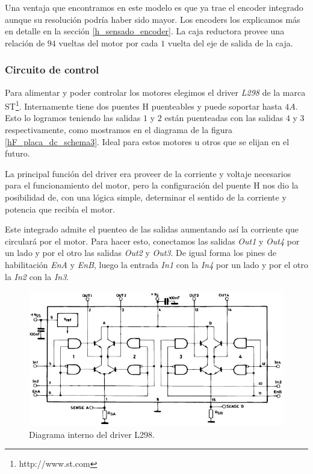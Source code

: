 Una ventaja que encontramos en este modelo es que ya trae el encoder integrado aunque su resoluci\'on podr\'ia haber sido mayor.
Los encoders los explicamos m\'as en detalle en la secci\'on \ref{h_sensado_encoder}.
La caja reductora provee una relaci\'on de $94$ vueltas del motor por cada $1$ vuelta del eje de salida de la caja.

\subsubsection{Circuito de control}
\label{h_actuadores_motorDC_circuito}

Para alimentar y poder controlar los motores elegimos el driver \emph{L298} de la marca ST\footnote{http://www.st.com}.
Internamente tiene dos puentes H puenteables y puede soportar hasta $4 A$.
Esto lo logramos teniendo las salidas $1$ y $2$ est\'an puenteadas con las salidas $4$ y $3$ respectivamente, como
mostramos en el diagrama de la figura \ref{hF_placa_dc_schema3}.
Ideal para estos motores u otros que se elijan en el futuro.

La principal funci\'on del driver era proveer de la corriente y voltaje necesarios para el funcionamiento del motor, pero la configuraci\'on
del puente H nos dio la posibilidad de, con una l\'ogica simple, determinar el sentido de la corriente y potencia que recib\'ia el motor.

Este integrado admite el puenteo de las salidas aumentando as\'i la corriente que circular\'a por el motor.
Para hacer esto, conectamos las salidas \emph{Out1} y \emph{Out4} por un lado y por el otro las salidas \emph{Out2} y \emph{Out3}.
De igual forma los pines de habilitaci\'on \emph{EnA} y \emph{EnB}, luego la entrada \emph{In1} con la \emph{In4} por un lado y
por el otro la \emph{In2} con la \emph{In3}.

\begin{figure}[ht]
	\centering
	\includegraphics[scale=0.40]{figuras/L298.png}
	\caption{Diagrama interno del driver L298.}
	\label{hF_l298}
\end{figure}

